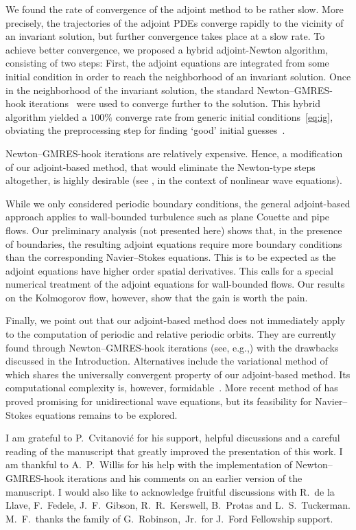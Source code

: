 \documentclass{jfm}
\begin{document}
We found the rate of convergence of the adjoint method to be rather slow. More precisely, the
trajectories of the adjoint PDEs converge rapidly to the vicinity of an invariant solution, but
further convergence takes place at a slow rate. To achieve better convergence, we proposed a
hybrid adjoint-Newton algorithm, consisting of two steps: First, the adjoint equations are
integrated from some initial condition in order to reach the neighborhood of an invariant solution.
Once in the neighborhood of the invariant solution, the standard Newton--GMRES-hook
iterations~\citep{DV04} were used to converge further to the solution. This hybrid algorithm
yielded a $100\%$ converge rate from generic initial conditions~\eqref{eq:ig},
obviating the preprocessing step for finding `good' initial guesses~\citep{DV04,CK13}.

Newton--GMRES-hook iterations are relatively expensive. Hence, a modification of
our adjoint-based method, that would eliminate the Newton-type steps altogether, is highly
desirable (see , in the context of nonlinear wave equations).

While we only considered periodic boundary conditions, the general adjoint-based approach applies
to wall-bounded turbulence such as plane Couette and pipe flows. Our preliminary analysis
(not presented here) shows that, in the presence of boundaries, the resulting adjoint equations
require more boundary conditions than the corresponding Navier--Stokes equations. This is to be
expected as the adjoint equations have higher order spatial derivatives. This calls for
a special numerical treatment of the adjoint equations for wall-bounded flows. Our results
on the Kolmogorov flow, however, show that the gain is worth the pain.

Finally, we point out that our adjoint-based method does not immediately
apply to the computation of periodic and relative periodic orbits.
They are currently found through Newton--GMRES-hook iterations
(see, e.g.,) with the drawbacks discussed in the Introduction.
Alternatives include the variational method of~ which shares the universally
convergent property of our adjoint-based method. Its computational complexity is, however,
formidable~\citep{Faz10}. More recent method of has proved promising for
unidirectional wave equations, but its feasibility for Navier--Stokes equations remains to
be explored.


\begin{acknowledgments}
I am grateful to P.~Cvitanovi\'c for his support, helpful discussions
and a careful reading of the manuscript
that greatly improved the presentation of this work.
I am thankful to A.~P.~Willis for
his help with the implementation of Newton--GMRES-hook iterations
and his comments on an earlier version of the manuscript.
I would also like to acknowledge fruitful discussions with R.~de la Llave, F.~Fedele, J.~F.~Gibson,
R.~R.~Kerswell, B.~Protas and L.~S.~Tuckerman.
M.~F.\ thanks the family of G.~Robinson,~Jr.\ for J.~Ford Fellowship
support.
\end{acknowledgments}
\end{document}
